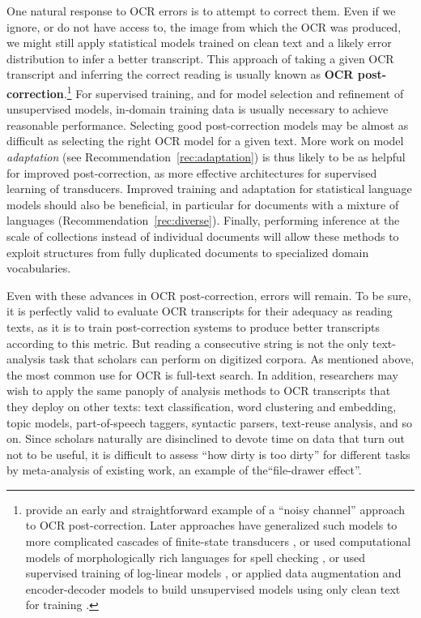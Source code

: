 \documentclass[twoside,11pt]{report}
\begin{document}
One natural response to OCR errors is to attempt to correct them. Even if we ignore, or do not have access to, the image from which the OCR was produced, we might still apply statistical models trained on clean text and a likely error distribution to infer a better transcript. This approach of taking a given OCR transcript and inferring the correct reading is usually known as \textbf{OCR post-correction}.\footnote{\cite{tong96:_statis_approac_autom_ocr_error_correc_contex} provide an early and straightforward example of a ``noisy channel'' approach to OCR post-correction. Later approaches have generalized such models to more complicated cascades of finite-state transducers \citep{kolak2003generative,xu17:_retriev_combin_repeat_passag_improv_ocr}, or used computational models of morphologically rich languages for spell checking \citep{boschetti09:_improv_ocr_accur_class_critic_edition}, or used supervised training of log-linear models \citep{lund2011progressive}, or applied data augmentation and encoder-decoder models to build unsupervised models using only clean text for training \citep{dong18:acl}.}  For supervised training, and for model selection and refinement of unsupervised models, in-domain training data is usually necessary to achieve reasonable performance. Selecting good post-correction models may be almost as difficult as selecting the right OCR model for a given text. More work on model \emph{adaptation} (see Recommendation~\ref{rec:adaptation}) is thus likely to be as helpful for improved post-correction, as more effective architectures for supervised learning of transducers. Improved training and adaptation for statistical language models should also be beneficial, in particular for documents with a mixture of languages (Recommendation~\ref{rec:diverse}). Finally, performing inference at the scale of collections instead of individual documents will allow these methods to exploit structures from fully duplicated documents to specialized domain vocabularies.

Even with these advances in OCR post-correction, errors will remain. To be sure, it is perfectly valid to evaluate OCR transcripts for their adequacy as reading texts, as it is to train post-correction systems to produce better transcripts according to this metric. But reading a consecutive string is not the only text-analysis task that scholars can perform on digitized corpora. As mentioned above, the most common use for OCR is full-text search. In addition, researchers may wish to apply the same panoply of analysis methods to OCR transcripts that they deploy on other texts: text classification, word clustering and embedding, topic models, part-of-speech taggers, syntactic parsers, text-reuse analysis, and so on. Since scholars naturally are disinclined to devote time on data that turn out not to be useful, it is difficult to assess ``how dirty is too dirty'' for different tasks by meta-analysis of existing work, an example of the``file-drawer effect''.
\end{document}
